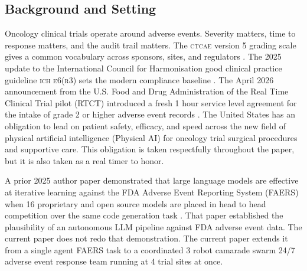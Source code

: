 %
%

\begin{sectionaccent}

\subsection{Background and Setting}
\label{sec:intro-background}

Oncology clinical trials operate around adverse events. Severity
matters, time to response matters, and the audit trail matters. The
\textsc{ctcae} version 5 grading scale gives a common vocabulary across
sponsors, sites, and regulators \cite{ctcae_v5_2017}. The 2025 update
to the International Council for Harmonisation good clinical practice
guideline \textsc{ich e6(r3)} sets the modern compliance baseline
\cite{ich_e6r3_2025}. The April 2026 announcement from the U.S. Food
and Drug Administration of the Real Time Clinical Trial pilot (RTCT)
introduced a fresh 1 hour service level agreement for the intake of
grade 2 or higher adverse event records \cite{fda_rtct_2026,
fda2026realtime}. The United States has an obligation to lead on
patient safety, efficacy, and speed across the new field of
physical artificial intelligence (Physical AI) for oncology trial
surgical procedures and supportive care. This obligation is taken
respectfully throughout the paper, but it is also taken as a real
timer to honor.

A prior 2025 author paper demonstrated that large language models are
effective at iterative learning against the FDA Adverse Event
Reporting System (FAERS) when 16 proprietary and open source models
are placed in head to head competition over the same code generation
task \cite{kawchak_2025_18029100}. That paper established the
plausibility of an autonomous LLM pipeline against FDA adverse event
data. The current paper does not redo that demonstration. The current
paper extends it from a single agent FAERS task to a coordinated
3 robot camarade swarm 24/7 adverse event response team running at
4 trial sites at once.


\end{sectionaccent}
